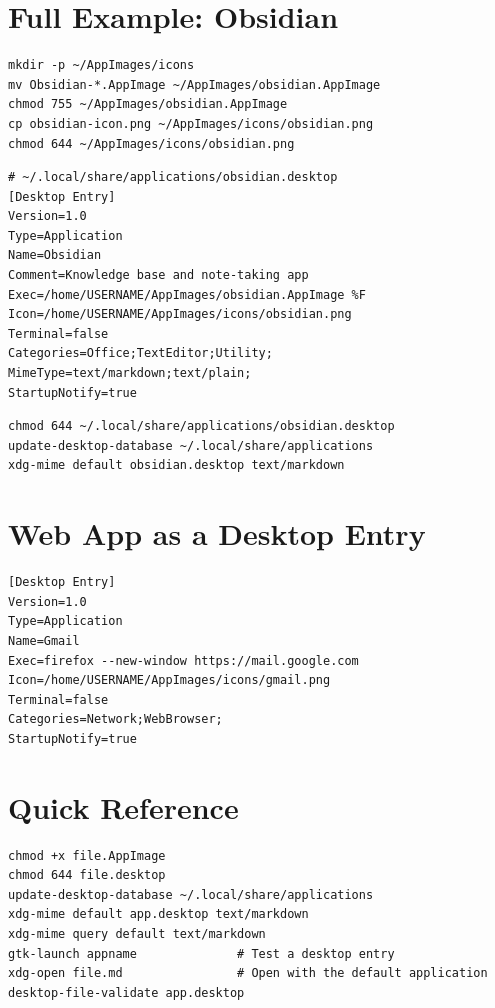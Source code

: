 \documentclass[12pt, a4paper]{book}
\begin{document}
\section{Full Example: Obsidian}
\begin{lstlisting}
mkdir -p ~/AppImages/icons
mv Obsidian-*.AppImage ~/AppImages/obsidian.AppImage
chmod 755 ~/AppImages/obsidian.AppImage
cp obsidian-icon.png ~/AppImages/icons/obsidian.png
chmod 644 ~/AppImages/icons/obsidian.png
\end{lstlisting}

\begin{lstlisting}
# ~/.local/share/applications/obsidian.desktop
[Desktop Entry]
Version=1.0
Type=Application
Name=Obsidian
Comment=Knowledge base and note-taking app
Exec=/home/USERNAME/AppImages/obsidian.AppImage %F
Icon=/home/USERNAME/AppImages/icons/obsidian.png
Terminal=false
Categories=Office;TextEditor;Utility;
MimeType=text/markdown;text/plain;
StartupNotify=true
\end{lstlisting}

\begin{lstlisting}
chmod 644 ~/.local/share/applications/obsidian.desktop
update-desktop-database ~/.local/share/applications
xdg-mime default obsidian.desktop text/markdown
\end{lstlisting}

\section{Web App as a Desktop Entry}
\begin{lstlisting}
[Desktop Entry]
Version=1.0
Type=Application
Name=Gmail
Exec=firefox --new-window https://mail.google.com
Icon=/home/USERNAME/AppImages/icons/gmail.png
Terminal=false
Categories=Network;WebBrowser;
StartupNotify=true
\end{lstlisting}

\section{Quick Reference}
\begin{lstlisting}
chmod +x file.AppImage
chmod 644 file.desktop
update-desktop-database ~/.local/share/applications
xdg-mime default app.desktop text/markdown
xdg-mime query default text/markdown
gtk-launch appname              # Test a desktop entry
xdg-open file.md                # Open with the default application
desktop-file-validate app.desktop
\end{lstlisting}
\end{document}
